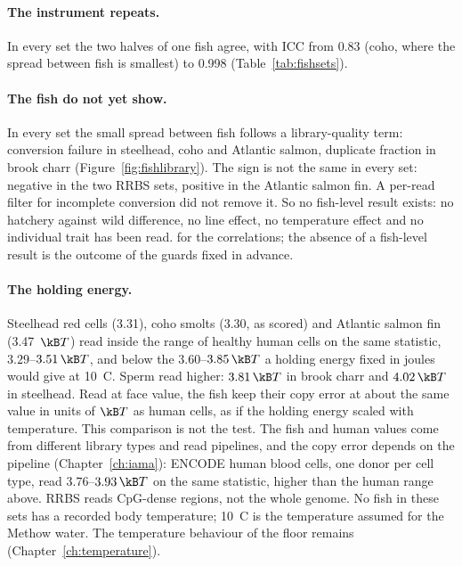 \paragraph{The instrument repeats.} In every set the two halves of one fish agree, with ICC from 0.83 (coho, where the spread
between fish is smallest) to 0.998 (Table~\ref{tab:fishsets}). \measured

\paragraph{The fish do not yet show.} In every set the small spread between fish follows a library-quality term: conversion
failure in steelhead, coho and Atlantic salmon, duplicate fraction in brook charr (Figure~\ref{fig:fishlibrary}). The sign is not
the same in every set: negative in the two RRBS sets, positive in the Atlantic salmon fin. A per-read filter for incomplete conversion did not remove it. So no fish-level result exists: no hatchery
against wild difference, no line effect, no temperature effect and no individual trait has been read. \measured{} for the
correlations; the absence of a fish-level result is the outcome of the guards fixed in advance.

\paragraph{The holding energy.} Steelhead red cells (3.31), coho smolts (3.30, as scored) and Atlantic salmon fin (3.47~$\kB T$) read inside the range of healthy human cells on the same statistic,
$3.29$--$3.51\,\kB T$, and below the $3.60$--$3.85\,\kB T$ a holding energy fixed in joules would give at 10~\textdegree C.
Sperm read higher: $3.81\,\kB T$ in brook charr and $4.02\,\kB T$ in steelhead. \measured{} Read at face value, the fish keep
their copy error at about the same value in units of $\kB T$ as human cells, as if the holding energy scaled with temperature.
\interp{} This comparison is not the test. The fish and human values come from different library types and read pipelines,
and the copy error depends on the pipeline (Chapter~\ref{ch:iama}): ENCODE human blood cells, one donor per cell type, read
$3.76$--$3.93\,\kB T$ on the same statistic, higher than the human range above. RRBS reads CpG-dense regions, not the whole
genome. No fish in these sets has a recorded body temperature; 10~\textdegree C is the temperature assumed for the Methow water.
The temperature behaviour of the floor remains \openprob{} (Chapter~\ref{ch:temperature}).

